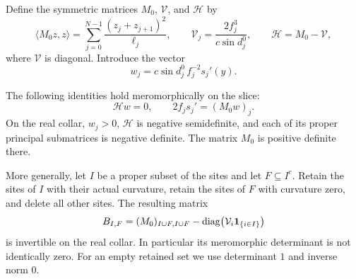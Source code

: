 Define the symmetric matrices \(M_0\), \(\mathcal V\), and \(\mathcal H\)
by
\begin{equation}
 \langle M_0z,z\rangle
   =\sum_{j=0}^{N-1}\frac{(z_j+z_{j+1})^2}{\ell_j},\qquad
 \mathcal V_j=\frac{2f_j^3}{c\sin d_j^0},\qquad
 \mathcal H=M_0-\mathcal V,
 \label{odd:Jacobi-matrix}
\end{equation}
where \(\mathcal V\) is diagonal.  Introduce the vector
\begin{equation}
 w_j=c\sin d_j^0\,f_j^{-2}s_j'(y).
 \label{odd:w-definition}
\end{equation}

\begin{lemma}
\label{lem:odd-matrices}
The following identities hold meromorphically on the slice:
\begin{equation}
 \mathcal H w=0,\qquad
 2f_js_j'=(M_0w)_j.
 \label{odd:jacobi-angle}
\end{equation}
On the real collar, \(w_j>0\), \(\mathcal H\) is negative semidefinite,
and each of its proper principal submatrices is negative definite.
The matrix \(M_0\) is positive definite there.

More generally, let \(I\) be a proper subset of the sites and let
\(F\subseteq I^c\).  Retain the sites of \(I\) with their actual curvature,
retain the sites of \(F\) with curvature zero, and delete all other sites.
The resulting matrix
\begin{equation}
 B_{I,F}
  =(M_0)_{I\cup F,I\cup F}
    -\operatorname{diag}\bigl(\mathcal V_i\mathbf 1_{\{i\in I\}}\bigr)
 \label{odd:modified-matrix}
\end{equation}
is invertible on the real collar.  In particular its meromorphic
determinant is not identically zero.  For an empty retained set we use
determinant \(1\) and inverse norm \(0\).
\end{lemma}

